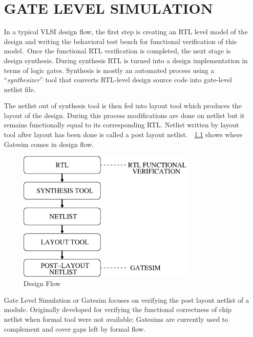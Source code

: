 \chapter{GATE LEVEL SIMULATION}
\label{chap:gate_intro.tex}

In a typical VLSI design flow, the first step is creating an RTL level model of the design and writing the behavioral test bench for functional verification of this model. Once the functional RTL verification is completed, the next stage is design synthesis. During synthesis RTL is turned into a design implementation in terms of logic gates. Synthesis is mostly an automated process using a “{\it synthesizer}” tool that converts RTL-level design source code into gate-level netlist file.

 The netlist out of synthesis tool is then fed into layout tool which produces the layout of the design. During this process modifications are done on netlist but it remains functionally equal to its corresponding RTL. Netlist written by layout tool after layout has been done is called a post layout netlist.~\figurename{~\ref{fig:gatesim.eps}} shows where Gatesim comes in design flow.

\begin{figure}[H]
\centering
\includegraphics[width=3.5in]{./figures/gatesim.eps}
\caption{Design Flow}
\label{fig:gatesim.eps}
\end{figure}
Gate Level Simulation or Gatesim focuses on verifying the post layout netlist of a module. Originally developed for verifying the functional correctness of chip netlist when formal tool were not available; Gatesims are currently used to complement and cover gaps left by formal flow. 


